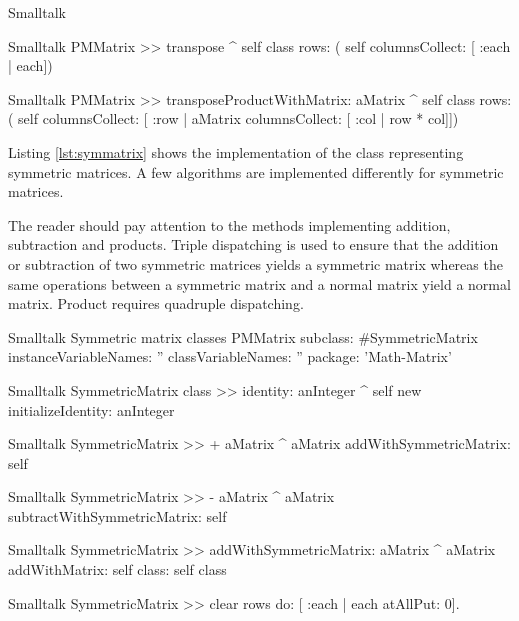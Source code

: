 \begin{displaycode}{Smalltalk}
\begin{displaycode}{Smalltalk}
PMMatrix >> transpose
    ^ self class rows: ( self columnsCollect: [ :each | each])
\end{displaycode}

\begin{displaycode}{Smalltalk}
PMMatrix >> transposeProductWithMatrix: aMatrix
    ^ self class rows: ( self columnsCollect: [ :row | aMatrix 
                                 columnsCollect: [ :col | row * col]])
\end{displaycode}

Listing \ref{lst:symmatrix} shows the implementation of the class  representing symmetric matrices.
A few algorithms are implemented differently for symmetric matrices.

The reader should pay attention to the methods implementing addition, subtraction and products.
Triple dispatching is used to ensure that the addition or subtraction of two symmetric matrices
yields a symmetric matrix whereas the same operations between a symmetric matrix and a normal matrix yield a normal matrix.
Product requires quadruple dispatching.

\begin{listing}[label=lst:symatrix]{Smalltalk}
{Symmetric matrix classes}
PMMatrix subclass: #SymmetricMatrix
   instanceVariableNames: ''
   classVariableNames: ''
   package: 'Math-Matrix'
\end{listing}

\begin{displaycode}{Smalltalk}
SymmetricMatrix class >> identity: anInteger
    ^ self new initializeIdentity: anInteger
\end{displaycode}

\begin{displaycode}{Smalltalk}
SymmetricMatrix >> + aMatrix
    ^ aMatrix addWithSymmetricMatrix: self
\end{displaycode}

\begin{displaycode}{Smalltalk}
SymmetricMatrix >> - aMatrix
    ^ aMatrix subtractWithSymmetricMatrix: self
\end{displaycode}

\begin{displaycode}{Smalltalk}
SymmetricMatrix >> addWithSymmetricMatrix: aMatrix
    ^ aMatrix addWithMatrix: self class: self class
\end{displaycode}

\begin{displaycode}{Smalltalk}
SymmetricMatrix >> clear
    rows do: [ :each | each atAllPut: 0].
\end{displaycode}


\end{displaycode}
